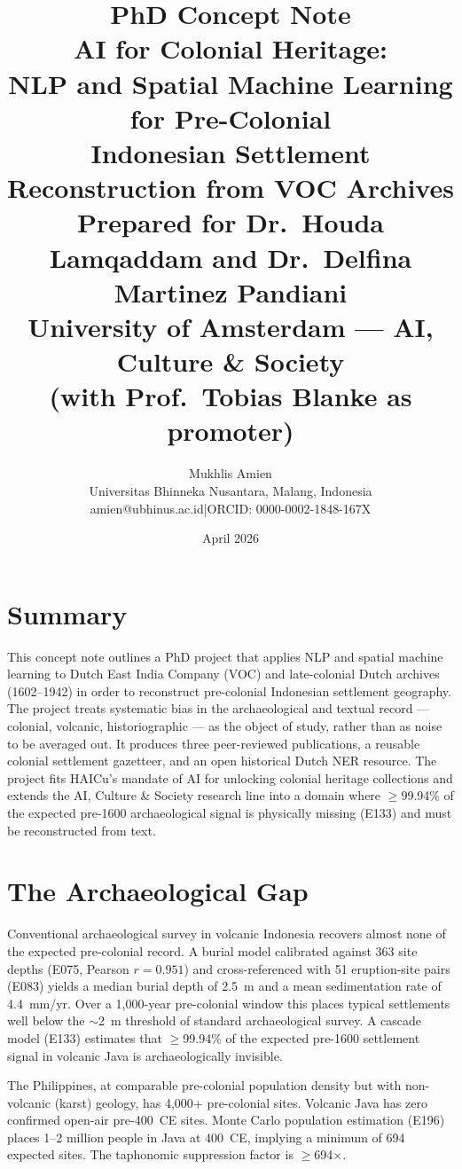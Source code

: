\documentclass[11pt,a4paper]{article}
\title{\textbf{PhD Concept Note}\\[0.4em]
\large AI for Colonial Heritage:\\
NLP and Spatial Machine Learning for Pre-Colonial\\
Indonesian Settlement Reconstruction from VOC Archives\\[0.8em]
\normalsize Prepared for Dr.\ Houda Lamqaddam and Dr.\ Delfina Martinez Pandiani\\
\normalsize University of Amsterdam --- AI, Culture \& Society\\
\normalsize (with Prof.\ Tobias Blanke as promoter)}
\author{Mukhlis Amien\\
\small Universitas Bhinneka Nusantara, Malang, Indonesia\\
\small amien@ubhinus.ac.id\quad|\quad ORCID: 0000-0002-1848-167X}
\date{April 2026}
\begin{document}
\maketitle

\section{Summary}

This concept note outlines a PhD project that applies NLP and spatial machine learning to Dutch East India Company (VOC) and late-colonial Dutch archives (1602--1942) in order to reconstruct pre-colonial Indonesian settlement geography. The project treats systematic bias in the archaeological and textual record --- colonial, volcanic, historiographic --- as the object of study, rather than as noise to be averaged out. It produces three peer-reviewed publications, a reusable colonial settlement gazetteer, and an open historical Dutch NER resource. The project fits HAICu's mandate of AI for unlocking colonial heritage collections and extends the AI, Culture \& Society research line into a domain where $\geq$99.94\% of the expected pre-1600 archaeological signal is physically missing (E133) and must be reconstructed from text.

\section{The Archaeological Gap}

Conventional archaeological survey in volcanic Indonesia recovers almost none of the expected pre-colonial record. A burial model calibrated against 363 site depths (E075, Pearson $r=0.951$) and cross-referenced with 51 eruption-site pairs (E083) yields a median burial depth of 2.5~m and a mean sedimentation rate of 4.4~mm/yr. Over a 1{,}000-year pre-colonial window this places typical settlements well below the $\sim$2~m threshold of standard archaeological survey. A cascade model (E133) estimates that $\geq$99.94\% of the expected pre-1600 settlement signal in volcanic Java is archaeologically invisible.

The Philippines, at comparable pre-colonial population density but with non-volcanic (karst) geology, has 4{,}000+ pre-colonial sites. Volcanic Java has zero confirmed open-air pre-400~CE sites. Monte Carlo population estimation (E196) places 1--2 million people in Java at 400~CE, implying a minimum of 694 expected sites. The taphonomic suppression factor is $\geq$694$\times$.
\end{document}
